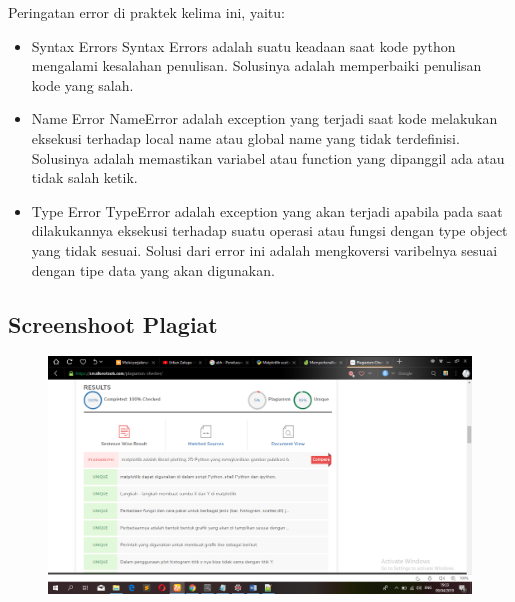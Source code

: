 \hfill \break
Peringatan error di praktek kelima ini, yaitu:
\begin{itemize}
	\item Syntax Errors
	Syntax Errors adalah suatu keadaan saat kode python mengalami kesalahan penulisan. Solusinya adalah memperbaiki penulisan kode yang salah.
	
	\item Name Error
	NameError adalah exception yang terjadi saat kode melakukan eksekusi terhadap local name atau global name yang tidak terdefinisi. Solusinya adalah memastikan variabel atau function yang dipanggil ada atau tidak salah ketik.
	
	\item Type Error
	TypeError adalah exception yang akan terjadi apabila pada saat dilakukannya eksekusi terhadap suatu operasi atau fungsi dengan type object yang tidak sesuai. Solusi dari error ini adalah mengkoversi varibelnya sesuai dengan tipe data yang akan digunakan.
\end{itemize}



\subsection{Screenshoot Plagiat}
\begin{figure}[H]
	\includegraphics[width=12cm]{figures/6/1174069/Praktek/plagiat.png}
	\centering
\end{figure}

